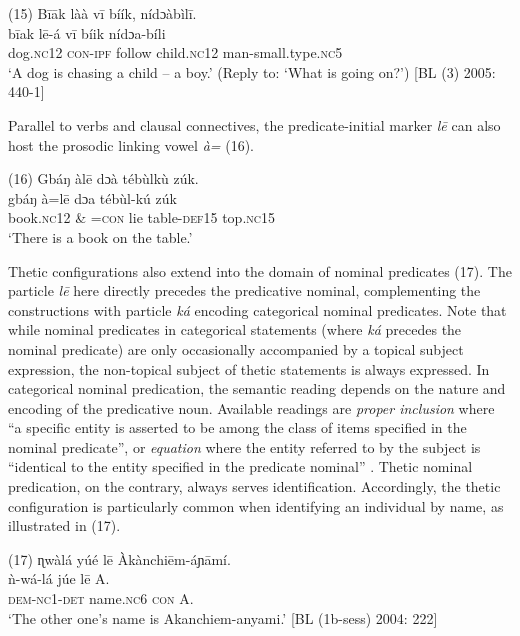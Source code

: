 \documentclass[output=paper]{langsci/langscibook}
\begin{document}
\gll \textup{(15)}  B\={i}\={a}k    làà    v\={i}  bíík,    nídɔàbìl\={i}.\\
\gll \textup{  b\={i}ak    l\={e}-á    v\={i}  bíik    nídɔa-bíli}\\
       dog.\textsc{nc}12  \textsc{con}{}-\textsc{ipf}  follow  child.\textsc{nc}12  man-small.type.\textsc{nc}5\\
\glt ‘A dog is chasing a child – a boy.’ (Reply to: ‘What is going on?’) [BL (3) 2005: 440-1]
\z

Parallel to verbs and clausal connectives, the predicate-initial marker \textit{l\={e} }can also host the prosodic linking vowel \textit{à}\textit{=} (16).

\gll \textup{(16)}  Gbáŋ    àl\={e}    dɔà  tébùlkù    zúk.\\
\gll \textup{  gbáŋ    à=l\={e}    dɔa  tébùl-kú  zúk}\\
       book.\textsc{nc}12   \& =\textsc{con}  lie  table-\textsc{def}15  top.\textsc{nc}15\\
\glt ‘There is a book on the table.’ \citep[271]{Schwarz2009}
\z

Thetic configurations also extend into the domain of nominal predicates (17). The particle \textit{l\={e} }here directly precedes the predicative nominal, complementing the constructions with particle \textit{ká }encoding categorical nominal predicates. Note that while nominal predicates in categorical statements (where \textit{ká }precedes the nominal predicate) are only occasionally accompanied by a topical subject expression, the non-topical subject of thetic statements is always expressed. In categorical nominal predication, the semantic reading depends on the nature and encoding of the predicative noun. Available readings are \textit{proper inclusion} where “a specific entity is asserted to be among the class of items specified in the nominal predicate”, or \textit{equation} where the entity referred to by the subject is “identical to the entity specified in the predicate nominal” \citep[114]{Payne1997}. Thetic nominal predication, on the contrary, always serves identification. Accordingly, the thetic configuration is particularly common when identifying an individual by name, as illustrated in (17).

\gll \textup{(17)}  ɳwàlá     yúé    l\={e}   Àkànchi\={e}m-áɲ\={a}mí.\\
\gll \textup{  ǹ}\textup{{}-wá-lá   júe    l\={e}   A.}\\
     \textsc{  }\textsc{dem}{}-\textsc{nc}1-\textsc{det  }name\textsc{.nc}6  \textsc{con}  A.\\
\glt ‘The other one’s name is Akanchiem-anyami.’ [BL (1b-sess) 2004: 222]
\z
\end{document}
